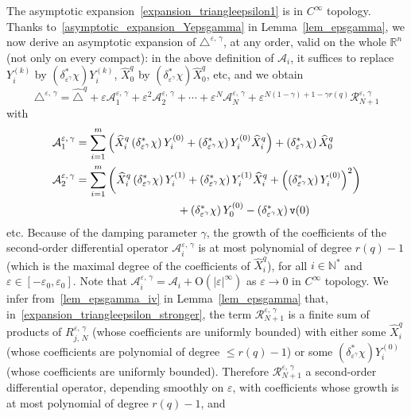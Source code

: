 \documentclass[AHL,Unicode,published]{cedram}
\newcommand*\R{\mathbb{R}}
\newcommand*\N{\mathbb{N}}
\newcommand{\calA}{\mathcal{A}}
\newcommand{\calR}{\mathcal{R}}
\newcommand{\ttv}{\mathtt{v}}
\newcommand{\rmO}{\mathrm{O}}
\renewcommand{\leq}{\leqslant}
\begin{document}
The asymptotic expansion~\eqref{expansion_triangleepsilon1} is in $C^\infty$ topology. Thanks to~\eqref{asymptotic_expansion_Yepsgamma} in Lemma~\ref{lem_epsgamma}, we now derive an asymptotic expansion of $\triangle^{\varepsilon,\,\gamma}$, at any order, valid on the whole $\R^n$ (not only on every compact): in the above definition of $\calA_i$, it suffices to replace $Y_i^{(k)}$ by $(\delta_{\varepsilon^\gamma}^*\chi)Y_i^{(k)}$, $\widehat{X}_0^q$ by $(\delta_{\varepsilon^\gamma}^*\chi)\widehat{X}_0^q$, etc, and we obtain
\begin{equation}\label{expansion_triangleepsilon_stronger}
\triangle^{\varepsilon,\,\gamma} = \widehat{\triangle}^{q} + \varepsilon \calA_1^{\varepsilon,\,\gamma} + \varepsilon^2 \calA_2^{\varepsilon,\,\gamma} + \cdots + \varepsilon^N \calA_N^{\varepsilon,\,\gamma} + \varepsilon^{N(1-\gamma)+1-\gamma r(q)} \calR_{N+1}^{\varepsilon,\,\gamma}
\end{equation}
with
\begin{equation}\label{def_Aiepsgam}
\begin{split}
\calA_1^{\varepsilon,\,\gamma} &= \sum_{i=1}^m \left(\widehat{X}^{q}_i \left(\delta_{\varepsilon^\gamma}^*\chi\right) Y^{(0)}_i + \left(\delta_{\varepsilon^\gamma}^*\chi\right) Y^{(0)}_i \widehat{X}^{q}_i \right) + \left(\delta_{\varepsilon^\gamma}^*\chi\right) \widehat{X}^{q}_0 \\
\calA_2^{\varepsilon,\,\gamma} &= \sum_{i=1}^m \left(\widehat{X}^{q}_i \left(\delta_{\varepsilon^\gamma}^*\chi\right) Y^{(1)}_i + \left(\delta_{\varepsilon^\gamma}^*\chi\right) Y^{(1)}_i \widehat{X}^{q}_i + \left(\left(\delta_{\varepsilon^\gamma}^*\chi\right) Y^{(0)}_i \right)^2 \right) \\
& \mkern165mu + \left(\delta_{\varepsilon^\gamma}^*\chi\right) Y^{(0)}_0 - \left(\delta_{\varepsilon^\gamma}^*\chi\right) \ttv(0)
\end{split}
\end{equation}
etc. Because of the damping parameter $\gamma$, the growth of the coefficients of the second-order differential operator $\calA_i^{\varepsilon,\,\gamma}$ is at most polynomial of degree $r(q)-1$ (which is the maximal degree of the coefficients of $\widehat{X}^{q}_i$), for all $i\in\N^*$ and $\varepsilon\in[-\varepsilon_0,\varepsilon_0]$. Note that $\calA_i^{\varepsilon,\,\gamma} = \calA_i + \rmO(\vert\varepsilon\vert^\infty)$ as $\varepsilon\rightarrow 0$ in $C^\infty$ topology. We infer from~\eqref{lem_epsgamma_iv} in Lemma~\ref{lem_epsgamma} that, in~\eqref{expansion_triangleepsilon_stronger}, the term $\calR_{N+1}^{\varepsilon,\,\gamma}$ is a finite sum of products of $R_{j,\,N}^{\varepsilon,\,\gamma}$ (whose coefficients are uniformly bounded) with either some $\widehat{X}^{q}_i$ (whose coefficients are polynomial of degree $\leq r(q)-1$) or some $(\delta_{\varepsilon^\gamma}^*\chi) Y^{(0)}_i$ (whose coefficients are uniformly bounded). Therefore $\calR_{N+1}^{\varepsilon,\,\gamma}$ a second-order differential operator, depending smoothly on $\varepsilon$, with coefficients whose growth is at most polynomial of degree $r(q)-1$, and
\end{document}
